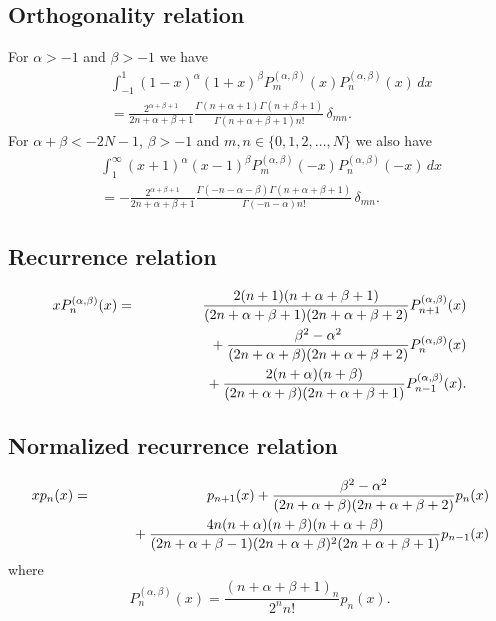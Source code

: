 \documentclass[envcountchap,graybox]{svmono}
\newcommand{\mathindent}{\hspace{7.5mm}}
\renewcommand{\Gamma}{\varGamma}
\begin{document}
\subsection*{Orthogonality relation}
For $\alpha>-1$ and $\beta>-1$ we have
\begin{eqnarray}
\label{OrtJacobi1}
& &\int_{-1}^1(1-x)^{\alpha}(1+x)^{\beta}P_m^{(\alpha,\beta)}(x)P_n^{(\alpha,\beta)}(x)\,dx\nonumber\\
& &{}=\frac{2^{\alpha+\beta+1}}{2n+\alpha+\beta+1}\frac{\Gamma(n+\alpha+1)\Gamma(n+\beta+1)}{\Gamma(n+\alpha+\beta+1)n!}\,\delta_{mn}.
\end{eqnarray}
For $\alpha+\beta<-2N-1$, $\beta>-1$ and $m,n\in\{0,1,2,\ldots,N\}$ we also have
\begin{eqnarray}
\label{OrtJacobi2}
& &\int_1^{\infty}(x+1)^{\alpha}(x-1)^{\beta}P_m^{(\alpha,\beta)}(-x)P_n^{(\alpha,\beta)}(-x)\,dx\nonumber\\
& &{}=-\frac{2^{\alpha+\beta+1}}{2n+\alpha+\beta+1}\frac{\Gamma(-n-\alpha-\beta)\Gamma(n+\alpha+\beta+1)}{\Gamma(-n-\alpha)n!}\,\delta_{mn}.
\end{eqnarray}

\subsection*{Recurrence relation}
\begin{eqnarray}
\label{RecJacobi}
xP_n^{(\alpha,\beta)}(x)&=&\frac{2(n+1)(n+\alpha+\beta+1)}{(2n+\alpha+\beta+1)(2n+\alpha+\beta+2)}P_{n+1}^{(\alpha,\beta)}(x)\nonumber\\
& &{}\mathindent{}+\frac{\beta^2-\alpha^2}{(2n+\alpha+\beta)(2n+\alpha+\beta+2)}P_n^{(\alpha,\beta)}(x)\nonumber\\
& &{}\mathindent\mathindent{}+\frac{2(n+\alpha)(n+\beta)}{(2n+\alpha+\beta)(2n+\alpha+\beta+1)}P_{n-1}^{(\alpha,\beta)}(x).
\end{eqnarray}

\subsection*{Normalized recurrence relation}
\begin{eqnarray}
\label{NormRecJacobi}
xp_n(x)&=&p_{n+1}(x)+\frac{\beta^2-\alpha^2}{(2n+\alpha+\beta)(2n+\alpha+\beta+2)}p_n(x)\nonumber\\
& &{}\mathindent{}+\frac{4n(n+\alpha)(n+\beta)(n+\alpha+\beta)}
{(2n+\alpha+\beta-1)(2n+\alpha+\beta)^2(2n+\alpha+\beta+1)}p_{n-1}(x)
\end{eqnarray}
where
$$P_n^{(\alpha,\beta)}(x)=\frac{(n+\alpha+\beta+1)_n}{2^nn!}p_n(x).$$
\end{document}
